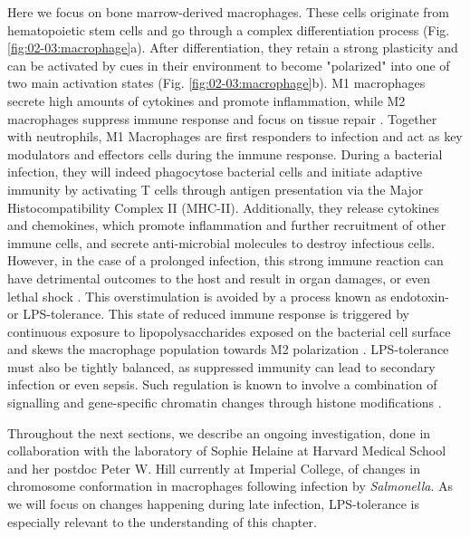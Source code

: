 Here we focus on bone marrow-derived macrophages. These cells originate from hematopoietic stem cells and go through a complex differentiation process (Fig. \ref{fig:02-03:macrophage}a). After differentiation, they retain a strong plasticity and can be activated by cues in their environment to become "polarized" into one of two main activation states (Fig. \ref{fig:02-03:macrophage}b). M1 macrophages secrete high amounts of cytokines and promote inflammation, while M2 macrophages suppress immune response and focus on tissue repair \cite{ahmedM1M2Macrophages2020}. Together with neutrophils, M1 Macrophages are first responders to infection and act as key modulators and effectors cells during the immune response. During a bacterial infection, they will indeed phagocytose bacterial cells and initiate adaptive immunity by activating T cells through antigen presentation via the Major Histocompatibility Complex II (MHC-II). Additionally, they release cytokines and chemokines, which promote inflammation and further recruitment of other immune cells, and secrete anti-microbial molecules to destroy infectious cells. However, in the case of a prolonged infection, this strong immune reaction can have detrimental outcomes to the host and result in organ damages, or even lethal shock \cite{magesGenomewideAnalysisLPS2008}. This overstimulation is avoided by a process known as endotoxin- or LPS-tolerance. This state of reduced immune response is triggered by continuous exposure to lipopolysaccharides exposed on the bacterial cell surface and skews the macrophage population towards M2 polarization \cite{portaToleranceM2Alternative2009}. LPS-tolerance must also be tightly balanced, as suppressed immunity can lead to secondary infection or even sepsis. Such regulation is known to involve a combination of signalling and gene-specific chromatin changes through histone modifications \cite{aungLPSRegulatesProinflammatory2006}.

 Throughout the next sections, we describe an ongoing investigation, done in collaboration with the laboratory of Sophie Helaine at Harvard Medical School and her postdoc Peter W. Hill currently at Imperial College, of changes in chromosome conformation in macrophages following infection by \textit{Salmonella}. As we will focus on changes happening during late infection, LPS-tolerance is especially relevant to the understanding of this chapter.

